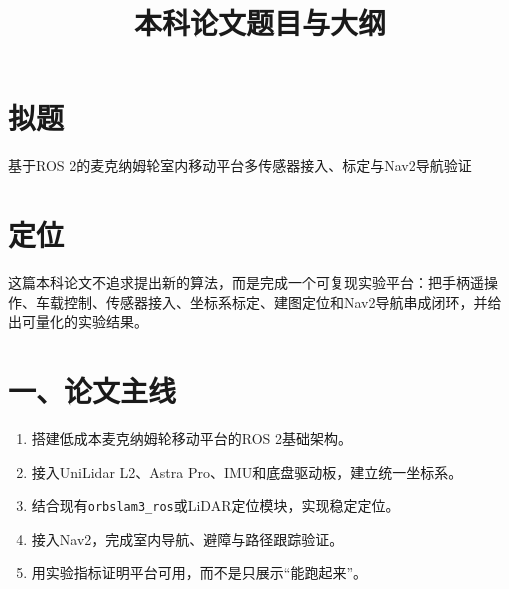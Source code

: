 \documentclass[UTF8,a4paper,11pt]{ctexart}
\title{本科论文题目与大纲}
\author{}
\date{}
\begin{document}
\maketitle

\section*{拟题}
基于ROS 2的麦克纳姆轮室内移动平台多传感器接入、标定与Nav2导航验证

\section*{定位}
这篇本科论文不追求提出新的算法，而是完成一个可复现实验平台：把手柄遥操作、车载控制、传感器接入、坐标系标定、建图定位和Nav2导航串成闭环，并给出可量化的实验结果。

\section*{一、论文主线}
\begin{enumerate}
  \item 搭建低成本麦克纳姆轮移动平台的ROS 2基础架构。
  \item 接入UniLidar L2、Astra Pro、IMU和底盘驱动板，建立统一坐标系。
  \item 结合现有\texttt{orbslam3\_ros}或LiDAR定位模块，实现稳定定位。
  \item 接入Nav2，完成室内导航、避障与路径跟踪验证。
  \item 用实验指标证明平台可用，而不是只展示“能跑起来”。
\end{enumerate}
\end{document}
